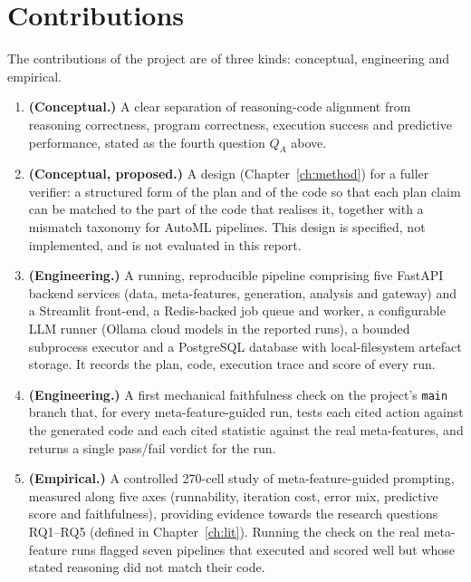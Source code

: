 \section{Contributions}

The contributions of the project are of three kinds: conceptual,
engineering and empirical.

\begin{enumerate}
    \item \textbf{(Conceptual.)} A clear separation of reasoning-code
    alignment from reasoning correctness, program correctness,
    execution success and predictive performance, stated as the
    fourth question $Q_A$ above.

    \item \textbf{(Conceptual, proposed.)} A design
    (Chapter~\ref*{ch:method}) for a fuller verifier: a structured
    form of the plan and of the code so that each plan claim can be
    matched to the part of the code that realises it, together with a
    mismatch taxonomy for AutoML pipelines. This design is specified,
    not implemented, and is not evaluated in this report.

    \item \textbf{(Engineering.)} A running, reproducible pipeline comprising
    five FastAPI backend services (data, meta-features, generation,
    analysis and gateway) and a Streamlit front-end, a Redis-backed
    job queue and worker, a
    configurable LLM runner (Ollama cloud models in the reported
    runs), a bounded subprocess executor and a PostgreSQL database with
    local-filesystem artefact storage. It records the plan, code,
    execution trace and score of every run.

    \item \textbf{(Engineering.)} A first mechanical faithfulness
    check on the project's \texttt{main} branch that, for every
    meta-feature-guided run, tests each cited action against the
    generated code and each cited statistic against the real
    meta-features, and returns a single pass/fail verdict for the run.

    \item \textbf{(Empirical.)} A controlled 270-cell study of
    meta-feature-guided prompting, measured along five axes
    (runnability, iteration cost, error mix, predictive score and
    faithfulness), providing evidence towards the research questions
    RQ1--RQ5 (defined in Chapter~\ref*{ch:lit}). Running the check on
    the real meta-feature runs flagged seven pipelines that executed
    and scored well but whose stated reasoning did not match their
    code.
\end{enumerate}

